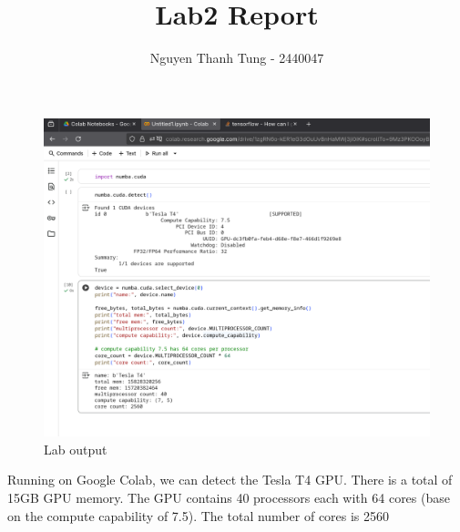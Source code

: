 \documentclass{article}
\title{Lab2 Report}
\author{Nguyen Thanh Tung - 2440047}
\begin{document}
\maketitle

\begin{figure}[h!]
    \centering
    \includegraphics[width=1\linewidth]{ss.png}
    \caption{Lab output}
    \label{fig:placeholder}
\end{figure}

Running on Google Colab, we can detect the Tesla T4 GPU. There is a total of 15GB GPU memory. The GPU contains 40 processors each with 64 cores (base on the compute capability of 7.5). The total number of cores is 2560
\end{document}
